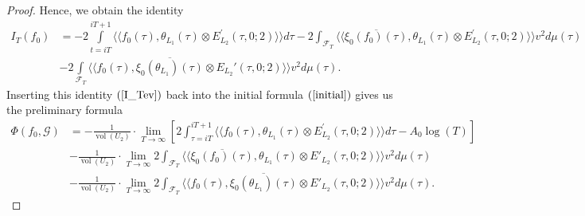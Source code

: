 \documentclass{amsart}
\theoremstyle{definition}
\begin{document}
\begin{proof}
Hence, we obtain the identity 
\begin{equation}\begin{aligned}\label{I_Tev} I_T(f_0) 
&= - 2 \int\limits_{t = iT}^{iT + 1} \langle \langle f_0(\tau), \theta_{L_1}(\tau) \otimes E_{L_2}^{\prime}(\tau, 0; 2)  \rangle \rangle d \tau
-2 \int_{\mathcal{F}_T} \langle \langle \overline{\xi_0(f_0)(\tau)}, \theta_{L_1}(\tau) \otimes E^{\prime}_{L_2}(\tau, 0; 2) \rangle \rangle v^2 d \mu(\tau) \\
&-2 \int\limits_{\mathcal{F}_T} \langle \langle f_0(\tau), \overline{\xi_0(\theta_{L_1})(\tau)} \otimes E_{L_2}'(\tau, 0; 2) \rangle \rangle v^2 d \mu(\tau).
\end{aligned}\end{equation}
Inserting this identity $(\ref{I_Tev})$ back into the initial formula $(\ref{initial})$ gives us the preliminary formula 
\begin{equation}\begin{aligned}\label{initial2} \Phi( f_0, \mathcal{G})
&= - \frac{1}{\operatorname{vol}(U_2)} \cdot \lim_{T \rightarrow \infty} 
\left[ 2 \int_{\tau = i T}^{iT +1} \langle \langle f_0(\tau), \theta_{L_1}(\tau) \otimes E^{\prime}_{L_2}(\tau, 0; 2)\rangle \rangle d \tau -  A_0 \log(T) \right] \\ 
&- \frac{1}{\operatorname{vol}(U_2)} \cdot \lim_{T \rightarrow \infty} 2 \int_{\mathcal{F}_T} \langle \langle \overline{\xi_0(f_0)(\tau)}, \theta_{L_1}(\tau) 
\otimes E'_{L_2}(\tau, 0; 2) \rangle \rangle v^2 d \mu(\tau) \\
&-  \frac{1}{\operatorname{vol}(U_2)} \cdot \lim_{T \rightarrow \infty} 2 \int_{\mathcal{F}_T} \langle \langle f_0(\tau), \overline{ \xi_0(\theta_{L_1})(\tau)} 
\otimes E'_{L_2}(\tau, 0; 2) \rangle \rangle v^2 d \mu(\tau). \end{aligned}\end{equation} 


\end{proof}
\end{document}
